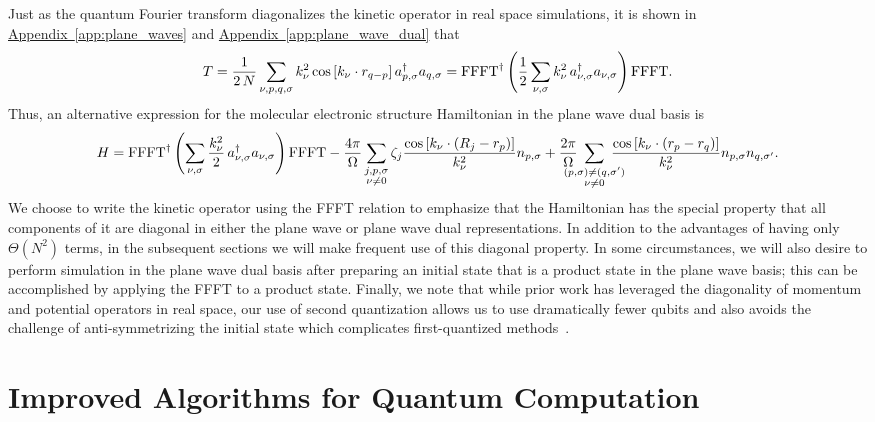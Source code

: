 \documentclass[superscriptaddress,aps,pra,nofootinbib,notitlepage,10pt,longbibliography]{revtex4-1}
\DeclareRobustCommand{\app}[1]{\hyperref[app:#1]{Appendix~\ref*{app:#1}}}
\begin{document}
Just as the quantum Fourier transform diagonalizes the kinetic operator in real space simulations, it is shown in \app{plane_waves} and \app{plane_wave_dual} that
\begin{equation}
\label{eq:kindiag0}
T =  \frac{1}{2\, N} \sum_{\nu, p, q, \sigma} k_\nu^2 \cos \left[k_\nu \cdot r_{q - p} \right] a^\dagger_{p, \sigma} a_{q,\sigma} = {\rm FFFT}^\dagger \left(\frac{1}{2} \sum_{\nu, \sigma} k_\nu^2 \, a_{\nu,\sigma}^\dagger a_{\nu,\sigma}\right) {\rm FFFT}.
\end{equation}
Thus, an alternative expression for the molecular electronic structure Hamiltonian in the plane wave dual basis is
\begin{equation}
\label{eq:pwdb_ham_diag}
H = {\rm FFFT}^\dagger \left(\sum_{\nu, \sigma} \frac{k_\nu^2}{2} \, a_{\nu,\sigma}^\dagger a_{\nu,\sigma}\right) {\rm FFFT}
%
- \frac{4 \pi}{\Omega} \sum_{\substack{j,p,\sigma\\ \nu\neq 0}} \zeta_j\frac{\cos\left[k_{\nu} \cdot \left(R_j - r_{p}\right)\right]}{k_\nu^2} n_{p, \sigma}
%
+\frac{2 \pi}{\Omega} \!\!\!\!\!\!\!  \sum_{\substack{(p,\sigma) \neq (q,\sigma') \\ \nu \neq 0}} \!\!\!\!\!\!\! \frac{\cos \left[k_\nu \cdot \left(r_p - r_q\right)\right]} {k_\nu^2} n_{p,\sigma} n_{q,\sigma'}.
\end{equation}
We choose to write the kinetic operator using the FFFT relation to emphasize that the Hamiltonian has the special property that all components of it are diagonal in either the plane wave or plane wave dual representations. In addition to the advantages of having only $\Theta(N^2)$ terms, in the subsequent sections we will make frequent use of this diagonal property. In some circumstances, we will also desire to perform simulation in the plane wave dual basis after preparing an initial state that is a product state in the plane wave basis; this can be accomplished by applying the FFFT to a product state. Finally, we note that while prior work has leveraged the diagonality of momentum and potential operators in real space, our use of second quantization allows us to use dramatically fewer qubits and also avoids the challenge of anti-symmetrizing the initial state which complicates first-quantized methods~\cite{Kivlichan2016,Kassal2010}.




\section{Improved Algorithms for Quantum Computation}
\label{sec:sec_two}
\end{document}
